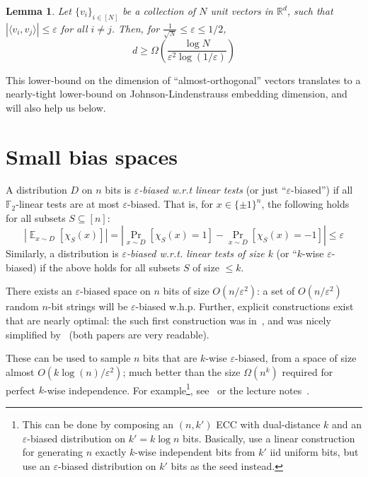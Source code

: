 \documentclass[]{article}
\newtheorem{lemma}[theorem]{Lemma}
\newcommand{\1}{\mathbb{1}}
\newcommand{\R}{\mathbb{R}}
\newcommand{\E}{\mathop{\mathbb{E}}}
\renewcommand{\epsilon}{\varepsilon}
\newcommand{\innp}[1]{\langle #1 \rangle}
\newcommand{\F}{\mathbb{F}}
\begin{document}
\begin{lemma}
    \label{lem:rank}
    Let $\{v_i\}_{i \in [N]}$ be a collection of $N$ unit vectors in $\R^d$,
    such that $|\innp{v_i, v_j}| \leq \epsilon$ for all $i \neq j$.
    Then, for $\frac{1}{\sqrt{N}} \leq \epsilon \leq 1/2$,
    $$d \geq \Omega\left(\frac{\log N}{\epsilon^2 \log(1/\epsilon)}\right)$$
\end{lemma}

This lower-bound on the dimension of ``almost-orthogonal'' vectors translates to a
nearly-tight lower-bound on Johnson-Lindenstrauss embedding dimension, and will
also help us below.

\section{Small bias spaces}
A distribution $D$ on $n$ bits
is \emph{$\epsilon$-biased w.r.t linear tests}  (or just ``$\epsilon$-biased'')
if all $\F_2$-linear tests are at most $\epsilon$-biased. That is,
for $x \in \{\pm 1\}^n$, the following holds for all subsets $S \subseteq [n]$:
$$\left|\E_{x \sim D}[\chi_S(x)]\right| = \left|\Pr_{x \sim D}[\chi_S(x) = 1] -
\Pr_{x \sim D}[\chi_S(x) = -1]\right| \leq \epsilon$$
Similarly, a distribution is \emph{$\epsilon$-biased w.r.t. linear tests of
size $k$} (or ``$k$-wise $\epsilon$-biased) if the above holds for all subsets $S$ of size $\leq k$.

There exists an $\epsilon$-biased space on $n$ bits of size $O(n / \epsilon^2)$:
a set of $O(n / \epsilon^2)$ random $n$-bit strings
will be $\epsilon$-biased w.h.p.
Further, explicit constructions exist that are nearly optimal: the such first
construction was in~\cite{NN}, and was nicely simplified by~\cite{alon92}
(both papers are very readable).

These can be used to sample $n$ bits that are $k$-wise $\epsilon$-biased,
from a space of size almost $O(k \log(n)/\epsilon^2)$; much better than the
size $\Omega(n^k)$ required for perfect $k$-wise independence.
For example\footnote{
    This can be done by composing an $(n, k')$ ECC with dual-distance $k$
    and an $\epsilon$-biased distribution on $k' = k\log n$ bits.
    Basically, use a linear construction for generating
$n$ exactly $k$-wise independent bits from $k'$ iid uniform bits,
but use an $\epsilon$-biased distribution on $k'$ bits as the seed instead.
},
see~\cite{alon92} or the lecture notes~\cite{umesh_notes}.
\end{document}
